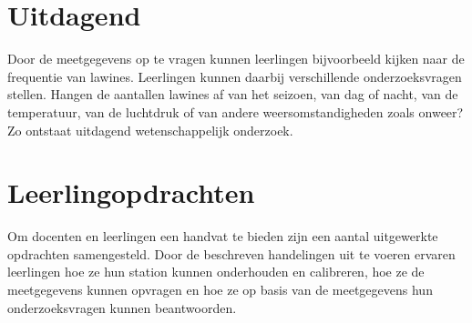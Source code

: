 \section{Uitdagend}

Door de meetgegevens op te vragen kunnen leerlingen bijvoorbeeld kijken
naar de frequentie van lawines.  Leerlingen kunnen daarbij verschillende
onderzoeksvragen stellen. Hangen de aantallen lawines af van het
seizoen, van dag of nacht, van de temperatuur, van de luchtdruk of van
andere weersomstandigheden zoals onweer? Zo ontstaat uitdagend
wetenschappelijk onderzoek. 


\section{Leerlingopdrachten}

Om docenten en leerlingen een handvat te bieden zijn een aantal
uitgewerkte opdrachten samengesteld. Door de beschreven handelingen uit
te voeren ervaren leerlingen hoe ze hun \hisparc station kunnen
onderhouden en calibreren, hoe ze de meetgegevens kunnen opvragen en hoe
ze op basis van de meetgegevens hun onderzoeksvragen kunnen beantwoorden.


